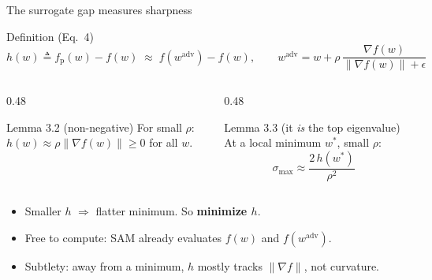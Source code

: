 \documentclass[aspectratio=169,10pt]{beamer}
\newcommand{\norm}[1]{\lVert #1\rVert}
\newcommand{\fp}{f_{\mathrm{p}}}
\newcommand{\mt}[1]{\textcolor{muted}{#1}}
\begin{document}
\begin{frame}{The surrogate gap measures sharpness}
\begin{block}{Definition (Eq.\ 4)}
\[ h(w) \triangleq \fp(w) - f(w) \;\approx\; f(w^{\mathrm{adv}}) - f(w),
\qquad w^{\mathrm{adv}} = w + \rho\,\frac{\nabla f(w)}{\norm{\nabla f(w)}+\epsilon} \]
\end{block}
\begin{columns}[T]
\begin{column}{0.48\textwidth}
\begin{exampleblock}{Lemma 3.2 \;(non-negative)}
For small $\rho$: $h(w)\approx\rho\norm{\nabla f(w)}\ge 0$ for all $w$.
\end{exampleblock}
\end{column}
\begin{column}{0.48\textwidth}
\begin{alertblock}{Lemma 3.3 \;(it \emph{is} the top eigenvalue)}
At a local minimum $w^*$, small $\rho$:
\[ \sigma_{\max} \approx \frac{2\,h(w^*)}{\rho^2} \]
\end{alertblock}
\end{column}
\end{columns}
\vspace{0.4em}
\begin{itemize}
  \item Smaller $h$ $\Rightarrow$ flatter minimum. \;So \textbf{minimize $h$}.
  \item Free to compute: SAM already evaluates $f(w)$ and $f(w^{\mathrm{adv}})$.
  \item \mt{Subtlety: away from a minimum, $h$ mostly tracks $\norm{\nabla f}$, not curvature.}
\end{itemize}
\end{frame}
\end{document}
